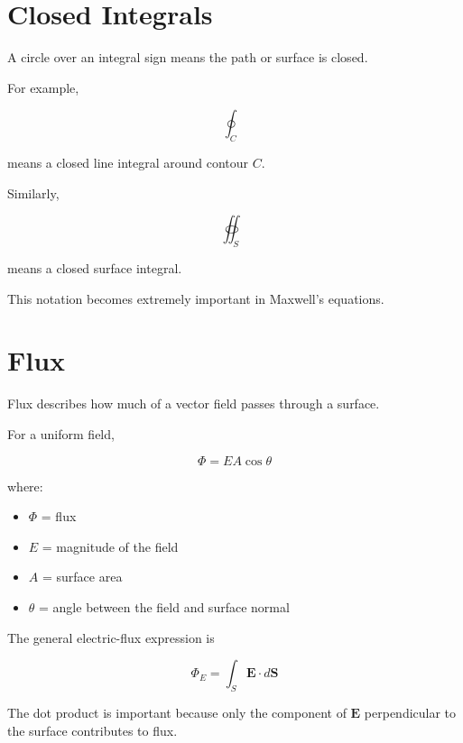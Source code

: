 \documentclass[11pt]{article}
\newcommand{\vect}[1]{\mathbf{#1}}
\begin{document}

\section{Closed Integrals}

A circle over an integral sign means the path or surface is closed.

For example,

\[
\oint_C
\]

means a closed line integral around contour $C$.

Similarly,

\[
\oiint_S
\]

means a closed surface integral.

This notation becomes extremely important in Maxwell's equations.



\section{Flux}

Flux describes how much of a vector field passes through a surface.

For a uniform field,

\[
\boxed{
\Phi
=
EA\cos\theta
}
\]

where:

\begin{itemize}
    \item $\Phi$ = flux
    \item $E$ = magnitude of the field
    \item $A$ = surface area
    \item $\theta$ = angle between the field and surface normal
\end{itemize}

The general electric-flux expression is

\[
\boxed{
\Phi_E
=
\int_S
\vect{E}\cdot d\vect{S}
}
\]

The dot product is important because only the component of $\vect{E}$ perpendicular to the surface contributes to flux.


\end{document}
